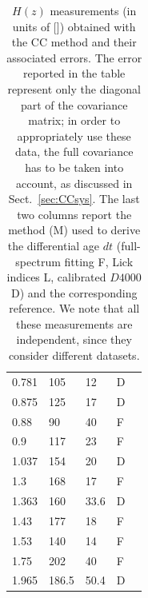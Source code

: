 \begin{table}[t!]
\begin{center}
\begin{tabular}{|llllr|}
0.781 & 105 & 12 & D & \cite{moresco2012}\\
0.875 & 125 & 17 & D & \cite{moresco2012}\\
0.88 & 90 & 40 & F & \cite{stern2010}\\
0.9 &  117 &  23 & F & \cite{simon2005}\\
1.037 & 154 & 20 & D & \cite{moresco2012}\\
1.3 & 168 & 17 & F & \cite{simon2005}\\
1.363 & 160 & 33.6 & D & \cite{moresco2015}\\
1.43 & 177 & 18 & F & \cite{simon2005}\\
1.53 & 140 & 14 & F & \cite{simon2005}\\
1.75 & 202 & 40 & F & \cite{simon2005}\\
1.965 & 186.5 & 50.4 & D & \cite{moresco2015}\\
\hline \hline
\end{tabular}
\caption{$H(z)$ measurements (in units of [\Hunit]) obtained with the CC method and their associated errors. The error reported in the table represent only the diagonal part of the covariance matrix; in order to appropriately use these data, the full covariance has to be taken into account, as discussed in Sect.~\ref{sec:CCsys}. The last two columns report the method (M) used to derive the differential age $dt$ (full-spectrum fitting F, Lick indices L, calibrated $D4000$ D) and the corresponding reference. We note that all these measurements are independent, since they consider different datasets.}
\label{tab:CC1}
\end{center}
\end{table}

